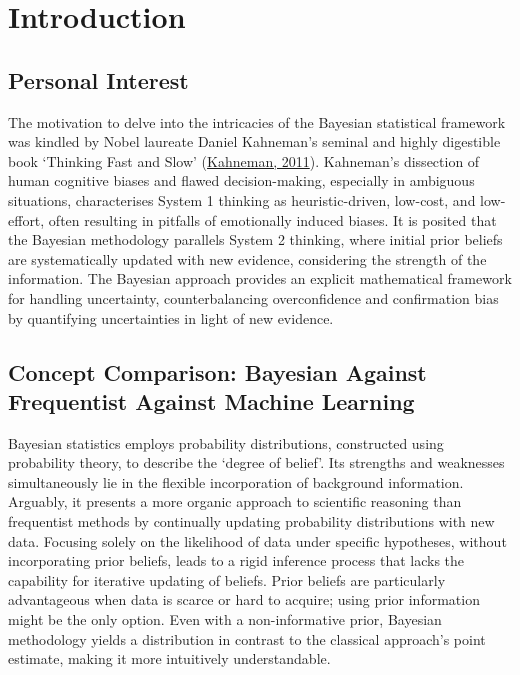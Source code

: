 \documentclass[
  11pt,
]{article}
\begin{document}
\newpage

\section{Introduction}
  \subsection{Personal Interest}

The motivation to delve into the intricacies of the Bayesian statistical
framework was kindled by Nobel laureate Daniel Kahneman's seminal and
highly digestible book `Thinking Fast and Slow'
(\protect\hyperlink{ref-Kahneman2011}{Kahneman, 2011}). Kahneman's
dissection of human cognitive biases and flawed decision-making,
especially in ambiguous situations, characterises System 1 thinking as
heuristic-driven, low-cost, and low-effort, often resulting in pitfalls
of emotionally induced biases. It is posited that the Bayesian
methodology parallels System 2 thinking, where initial prior beliefs are
systematically updated with new evidence, considering the strength of
the information. The Bayesian approach provides an explicit mathematical
framework for handling uncertainty, counterbalancing overconfidence and
confirmation bias by quantifying uncertainties in light of new evidence.

\subsection{Concept Comparison: Bayesian Against Frequentist Against Machine Learning}

Bayesian statistics employs probability distributions, constructed using
probability theory, to describe the `degree of belief'. Its strengths
and weaknesses simultaneously lie in the flexible incorporation of
background information. Arguably, it presents a more organic approach to
scientific reasoning than frequentist methods by continually updating
probability distributions with new data. Focusing solely on the
likelihood of data under specific hypotheses, without incorporating
prior beliefs, leads to a rigid inference process that lacks the
capability for iterative updating of beliefs. Prior beliefs are
particularly advantageous when data is scarce or hard to acquire; using
prior information might be the only option. Even with a non-informative
prior, Bayesian methodology yields a distribution in contrast to the
classical approach's point estimate, making it more intuitively
understandable.
\end{document}
